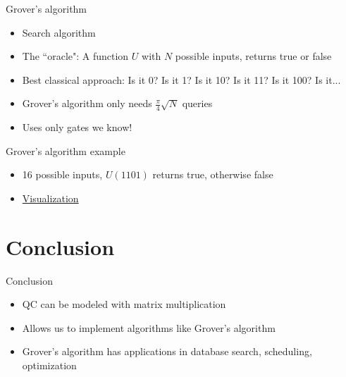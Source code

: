 \documentclass[14pt]{beamer}
\let\olditem\item
\renewcommand{\item}{%
\olditem\vspace{10pt}}
\begin{document}
\begin{frame}{Grover's algorithm}
\begin{itemize}
	\item Search algorithm
	\item The ``oracle": A function $U$ with $N$ possible inputs, returns true or false
	\item Best classical approach: Is it 0? Is it 1? Is it 10? Is it 11? Is it 100? Is it...
	\item Grover's algorithm only needs $\frac{\pi}{4}\sqrt{N}$ queries
	\item Uses only gates we know!
\end{itemize}
\end{frame}

\begin{frame}{Grover's algorithm example}
\begin{itemize}
	\item 16 possible inputs, $U(1101)$ returns true, otherwise false
	\item \href{http://algorithmicassertions.com/quirk\#circuit={"cols":[["X","X","X","X"],["H","H","H","H"],["Chance4"],["Sample4"],["Z","\%E2\%80\%A2","\%E2\%97\%A6","\%E2\%80\%A2"],["H","H","H","H"],["Z","\%E2\%80\%A2","\%E2\%80\%A2","\%E2\%80\%A2"],["H","H","H","H"],["Chance4"],["Sample4"],["Z","\%E2\%80\%A2","\%E2\%97\%A6","\%E2\%80\%A2"],["H","H","H","H"],["Z","\%E2\%80\%A2","\%E2\%80\%A2","\%E2\%80\%A2"],["H","H","H","H"],["Chance4"],["Sample4"],["Z","\%E2\%80\%A2","\%E2\%97\%A6","\%E2\%80\%A2"],["H","H","H","H"],["Z","\%E2\%80\%A2","\%E2\%80\%A2","\%E2\%80\%A2"],["H","H","H","H"],["Chance4"],["Sample4"]]}}{Visualization}
\end{itemize}
\end{frame}

\section{Conclusion}
\begin{frame}{Conclusion}
\begin{itemize}
	\item QC can be modeled with matrix multiplication
	\item Allows us to implement algorithms like Grover's algorithm
	\item Grover's algorithm has applications in database search, scheduling, optimization
\end{itemize}
\end{frame}
\end{document}
